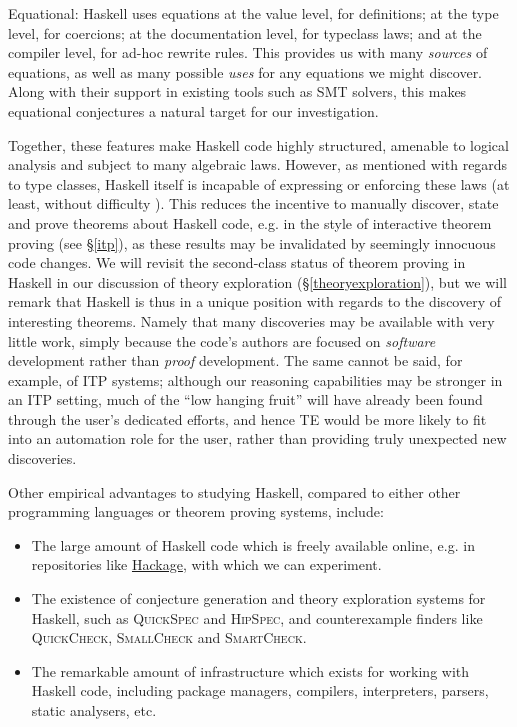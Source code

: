 \documentclass[]{article}
\begin{document}
\begin{description}
\item{Equational}: Haskell uses equations at the value level, for definitions; at the type level, for coercions; at the documentation level, for typeclass laws; and at the compiler level, for ad-hoc rewrite rules. This provides us with many \emph{sources} of equations, as well as many possible \emph{uses} for any equations we might discover. Along with their support in existing tools such as SMT solvers, this makes equational conjectures a natural target for our investigation.

\end{description}

Together, these features make Haskell code highly structured, amenable to logical analysis and subject to many algebraic laws. However, as mentioned with regards to type classes, Haskell itself is incapable of expressing or enforcing these laws (at least, without difficulty \cite{lindley2014hasochism}). This reduces the incentive to manually discover, state and prove theorems about Haskell code, e.g. in the style of interactive theorem proving (see \S \ref{itp}), as these results may be invalidated by seemingly innocuous code changes. We will revisit the second-class status of theorem proving in Haskell in our discussion of theory exploration (\S \ref{theoryexploration}), but we will remark that Haskell is thus in a unique position with regards to the discovery of interesting theorems. Namely that many discoveries may be available with very little work, simply because the code's authors are focused on \emph{software} development rather than \emph{proof} development. The same cannot be said, for example, of ITP systems; although our reasoning capabilities may be stronger in an ITP setting, much of the ``low hanging fruit'' will have already been found through the user's dedicated efforts, and hence TE would be more likely to fit into an automation role for the user, rather than providing truly unexpected new discoveries.

Other empirical advantages to studying Haskell, compared to either other programming languages or theorem proving systems, include:

\begin{itemize}

\item The large amount of Haskell code which is freely available online, e.g. in repositories like \href{http://hackage.haskell.org}{Hackage}, with which we can experiment.

\item The existence of conjecture generation and theory exploration systems for Haskell, such as \textsc{QuickSpec} and \textsc{HipSpec}, and counterexample finders like \textsc{QuickCheck}, \textsc{SmallCheck} and \textsc{SmartCheck}.

\item The remarkable amount of infrastructure which exists for working with Haskell code, including package managers, compilers, interpreters, parsers, static analysers, etc.

\end{itemize}
\end{document}
